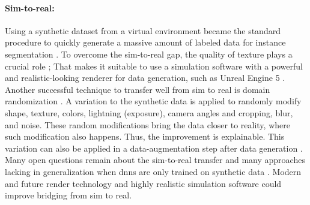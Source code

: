 		\paragraph{Sim-to-real:} Using a synthetic dataset from a virtual environment became the standard procedure to quickly generate a massive amount of labeled data for instance segmentation \cite{Danielczuk2019}\cite{Xie2020}\cite{Xie2021}\cite{Shao2018}\cite{Toda2019}. To overcome the sim-to-real gap, the quality of texture plays a crucial role \cite{Tabak2023}\cite{Martinez2019}; That makes it suitable to use a simulation software with a powerful and realistic-looking renderer for data generation, such as Unreal Engine 5 \cite{Romero2022}.\\
		Another successful technique to transfer well from sim to real is domain randomization \cite{Raj2023}. A variation to the synthetic data is applied to randomly modify shape, texture, colors, lightning (exposure), camera angles and cropping, blur, and noise. These random modifications bring the data closer to reality, where such modification also happens. Thus, the improvement is explainable. This variation can also be applied in a data-augmentation step after data generation \cite{Kar2022}.\\
		Many open questions remain about the sim-to-real transfer and many approaches lacking in generalization when \ac{dnn}s are only trained on synthetic data \cite{Doersch2019}. Modern and future render technology and highly realistic simulation software could improve bridging from sim to real.
